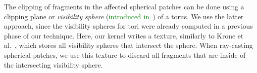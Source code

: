 The clipping of fragments in the affected spherical patches can be done using a clipping plane or \textit{visibility sphere} (\textcolor{green}{introduced in~\cite{krone2009interactive}}) of a torus.
We use the latter approach, since the visibility spheres for tori were already computed in a previous phase of our technique.
Here, our kernel writes a texture, similarly to Krone et al.~\cite{krone2011parallel}, which stores all visibility spheres that intersect the sphere.
When ray-casting spherical patches, we use this texture to discard all fragments that are inside of the intersecting visibility sphere.
